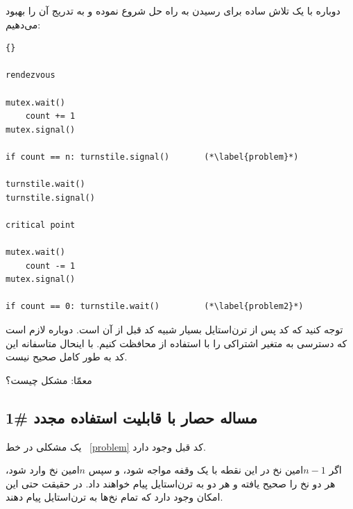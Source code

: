 \documentclass{book}
\newcommand{\clearemptydoublepage}{\newpage\cleardoublepage}
\begin{document}
    دوباره با یک تلاش ساده برای رسیدن به راه حل شروع نموده و به تدریج آن را بهبود می‌دهیم:

\begin{latin}
\begin{latin}
\begin{lstlisting}[title=\rl{  نا راه حل حصار با قابلیت استفاده مجدد}]{} 

rendezvous

mutex.wait()
    count += 1
mutex.signal()

if count == n: turnstile.signal()       (*\label{problem}*)

turnstile.wait()
turnstile.signal()

critical point

mutex.wait()
    count -= 1
mutex.signal()

if count == 0: turnstile.wait()         (*\label{problem2}*)
\end{lstlisting}
\end{latin}
\end{latin}

    توجه کنید که کد پس از تر‌ن‌استایل بسیار شبیه کد قبل از آن است. دوباره لازم است که دسترسی به متغیر اشتراکی  را 
    با استفاده از  محافظت کنیم. با اینحال متاسفانه این کد به طور کامل صحیح نیست. 

    معمّا: مشکل چیست؟


\clearemptydoublepage
\subsection 
{ مساله حصار با قابلیت استفاده مجدد  \#1}

    یک مشکلی در خط ~\ref{problem} کد قبل وجود دارد. 

    اگر $n-1$امین نخ در این نقطه با یک وقفه مواجه شود، و سپس $n$امین نخ وارد  شود، هر دو نخ  
    را صحیح یافته و هر دو به ترن‌استایل پیام خواهند داد. در حقیقت حتی این امکان وجود دارد که تمام نخ‌ها به ترن‌استایل پیام دهند. 
\end{document}
